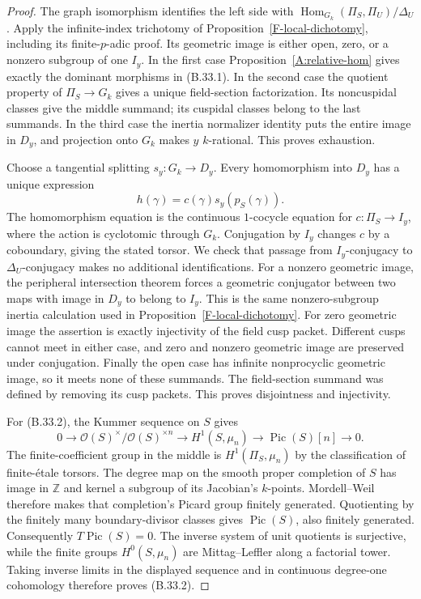 \documentclass[11pt,oneside]{article}
\begin{document}
\begin{proof}
The graph isomorphism identifies the left side with
$\operatorname{Hom}_{G_k}(\Pi_S,\Pi_U)/\Delta_U$.
Apply the infinite-index trichotomy of
Proposition~\ref{F-local-dichotomy}, including its
finite-$p$-adic proof. Its geometric image is either
open, zero, or a nonzero subgroup of one $I_y$.
In the first case Proposition~\ref{A:relative-hom}
gives exactly the dominant morphisms in (B.33.1).
In the second case the quotient property of
$\Pi_S\to G_k$ gives a unique field-section
factorization. Its noncuspidal classes give the
middle summand; its cuspidal classes belong to the
last summands. In the third case the inertia
normalizer identity puts the entire image in
$D_y$, and projection onto $G_k$ makes $y$
$k$-rational. This proves exhaustion.

Choose a tangential splitting $s_y:G_k\to D_y$.
Every homomorphism into $D_y$ has a unique expression
\[
 h(\gamma)=c(\gamma)s_y(p_S(\gamma)).
\]
The homomorphism equation is the continuous
$1$-cocycle equation for $c:\Pi_S\to I_y$, where
the action is cyclotomic through $G_k$.
Conjugation by $I_y$ changes $c$ by a coboundary,
giving the stated torsor.
We check that passage from $I_y$-conjugacy to
$\Delta_U$-conjugacy makes no additional
identifications. For a nonzero geometric image,
the peripheral intersection theorem forces a
geometric conjugator between two maps with image
in $D_y$ to belong to $I_y$. This is the same
nonzero-subgroup inertia calculation used in
Proposition~\ref{F-local-dichotomy}.
For zero geometric image the assertion is exactly
injectivity of the field cusp packet. Different
cusps cannot meet in either case, and zero and
nonzero geometric image are preserved under
conjugation. Finally the open case has infinite
nonprocyclic geometric image, so it meets none
of these summands. The field-section summand
was defined by removing its cusp packets.
This proves disjointness and injectivity.

For (B.33.2), the Kummer sequence on $S$ gives
\[
 0\to\mathcal O(S)^\times/\mathcal O(S)^{\times n}
   \to H^1(S,\mu_n)\to\operatorname{Pic}(S)[n]\to0.
\]
The finite-coefficient group in the middle is
$H^1(\Pi_S,\mu_n)$ by the classification of
finite-\'etale torsors. The degree map on the
smooth proper completion of $S$ has image in
$\mathbb Z$ and kernel a subgroup of its
Jacobian's $k$-points. Mordell--Weil therefore
makes that completion's Picard group finitely
generated. Quotienting by the finitely many
boundary-divisor classes gives
$\operatorname{Pic}(S)$, also finitely generated.
Consequently $T\operatorname{Pic}(S)=0$.
The inverse system of unit quotients is
surjective, while the finite groups
$H^0(S,\mu_n)$ are Mittag--Leffler along a
factorial tower. Taking inverse limits in the
displayed sequence and in continuous degree-one
cohomology therefore proves (B.33.2).


\end{proof}
\end{document}
